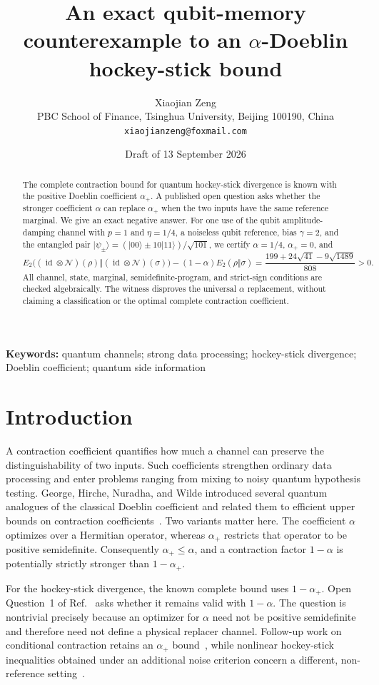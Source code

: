 \documentclass[11pt]{article}
\title{An exact qubit-memory counterexample to an
$\alpha$-Doeblin hockey-stick bound}
\author{Xiaojian Zeng\\
\small PBC School of Finance, Tsinghua University, Beijing 100190, China\\
\small \texttt{xiaojianzeng@foxmail.com}}
\date{Draft of 13 September 2026}
\newcommand{\cN}{\mathcal N}
\newcommand{\id}{\operatorname{id}}
\newcommand{\ket}[1]{\lvert #1\rangle}
\begin{document}
\maketitle

\begin{abstract}
The complete contraction bound for quantum hockey-stick divergence is known
with the positive Doeblin coefficient $\alpha_+$.  A published open question
asks whether the stronger coefficient $\alpha$ can replace $\alpha_+$ when
the two inputs have the same reference marginal.  We give an exact negative
answer.  For one use of the qubit amplitude-damping channel with
$p=1$ and $\eta=1/4$, a noiseless qubit reference, bias $\gamma=2$, and the
entangled pair
$\ket{\psi_\pm}=(\ket{00}\pm10\ket{11})/\sqrt{101}$, we certify
$\alpha=1/4$, $\alpha_+=0$, and
\[
 E_2\bigl((\id\otimes\cN)(\rho)\Vert(\id\otimes\cN)(\sigma)\bigr)
 -(1-\alpha)E_2(\rho\Vert\sigma)
 =\frac{199+24\sqrt{41}-9\sqrt{1489}}{808}>0.
\]
All channel, state, marginal, semidefinite-program, and strict-sign
conditions are checked algebraically.  The witness disproves the universal
$\alpha$ replacement, without claiming a classification or the optimal
complete contraction coefficient.
\end{abstract}

\noindent\textbf{Keywords:} quantum channels; strong data processing;
hockey-stick divergence; Doeblin coefficient; quantum side information

\section{Introduction}

A contraction coefficient quantifies how much a channel can preserve the
distinguishability of two inputs.  Such coefficients strengthen ordinary
data processing and enter problems ranging from mixing to noisy quantum
hypothesis testing.  George, Hirche, Nuradha, and Wilde introduced several
quantum analogues of the classical Doeblin coefficient and related them to
efficient upper bounds on contraction coefficients~\cite{GeorgeEtAl2026}.
Two variants matter here.  The coefficient $\alpha$ optimizes over a
Hermitian operator, whereas $\alpha_+$ restricts that operator to be positive
semidefinite.  Consequently $\alpha_+\leq\alpha$, and a contraction factor
$1-\alpha$ is potentially strictly stronger than $1-\alpha_+$.

For the hockey-stick divergence, the known complete bound uses
$1-\alpha_+$.  Open Question~1 of Ref.~\cite{GeorgeEtAl2026} asks whether it
remains valid with $1-\alpha$.  The question is nontrivial precisely because
an optimizer for $\alpha$ need not be positive semidefinite and therefore
need not define a physical replacer channel.  Follow-up work on conditional
contraction retains an $\alpha_+$ bound~\cite{HircheEtAl2026Conditional},
while nonlinear hockey-stick inequalities obtained under an additional noise
criterion concern a different, non-reference setting~\cite{NuradhaEtAl2025Nonlinear}.
\end{document}
